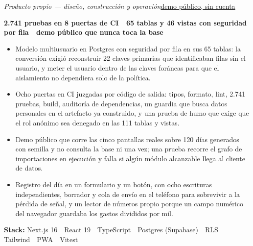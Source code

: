 \documentclass[a4paper,10pt]{article}
\newcommand{\subline}[2]{\textit{#1}\hfill{\small #2}\par}
\begin{document}
\subline{Producto propio --- diseño, construcción y operación}{\href{https://kairo.davirson.com/demo}{demo público, sin cuenta}}
{\small\bfseries\color{cold} 2.741 pruebas en 8 puertas de CI \,\textperiodcentered\, 65 tablas y 46 vistas con seguridad por fila \,\textperiodcentered\, demo público que nunca toca la base}\par
\begin{itemize}[leftmargin=1.1em, itemsep=0pt, topsep=1pt, parsep=0pt]
  \item Modelo multiusuario en Postgres con seguridad por fila en sus 65 tablas: la conversión exigió reconstruir 22 claves primarias que identificaban filas sin el usuario, y meter el usuario dentro de las claves foráneas para que el aislamiento no dependiera solo de la política.
  \item Ocho puertas en CI juzgadas por código de salida: tipos, formato, lint, 2.741 pruebas, build, auditoría de dependencias, un guardia que busca datos personales en el artefacto ya construido, y una prueba de humo que exige que el rol anónimo sea denegado en las 111 tablas y vistas.
  \item Demo público que corre las cinco pantallas reales sobre 120 días generados con semilla y no consulta la base ni una vez; una prueba recorre el grafo de importaciones en ejecución y falla si algún módulo alcanzable llega al cliente de datos.
  \item Registro del día en un formulario y un botón, con ocho escrituras independientes, borrador y cola de envío en el teléfono para sobrevivir a la pérdida de señal, y un lector de números propio porque un campo numérico del navegador guardaba los gastos divididos por mil.
\end{itemize}
{\small\textbf{Stack:} Next.js 16 \,\textperiodcentered\, React 19 \,\textperiodcentered\, TypeScript \,\textperiodcentered\, Postgres (Supabase) \,\textperiodcentered\, RLS \,\textperiodcentered\, Tailwind \,\textperiodcentered\, PWA \,\textperiodcentered\, Vitest}\par
\vspace{4pt}
\end{document}
